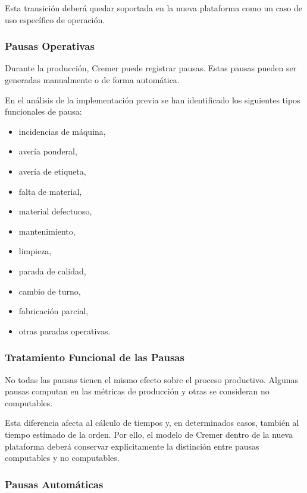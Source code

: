 Esta transición deberá quedar soportada en la nueva plataforma como un caso de uso específico de operación.

\subsubsection{Pausas Operativas}

Durante la producción, Cremer puede registrar pausas. Estas pausas pueden ser generadas manualmente o de forma automática.

En el análisis de la implementación previa se han identificado los siguientes tipos funcionales de pausa:

\begin{itemize}
    \item incidencias de máquina,
    \item avería ponderal,
    \item avería de etiqueta,
    \item falta de material,
    \item material defectuoso,
    \item mantenimiento,
    \item limpieza,
    \item parada de calidad,
    \item cambio de turno,
    \item fabricación parcial,
    \item otras paradas operativas.
\end{itemize}

\subsubsection{Tratamiento Funcional de las Pausas}

No todas las pausas tienen el mismo efecto sobre el proceso productivo. Algunas pausas computan en las métricas de producción y otras se consideran no computables.

Esta diferencia afecta al cálculo de tiempos y, en determinados casos, también al tiempo estimado de la orden. Por ello, el modelo de Cremer dentro de la nueva plataforma deberá conservar explícitamente la distinción entre pausas computables y no computables.

\subsubsection{Pausas Automáticas}

